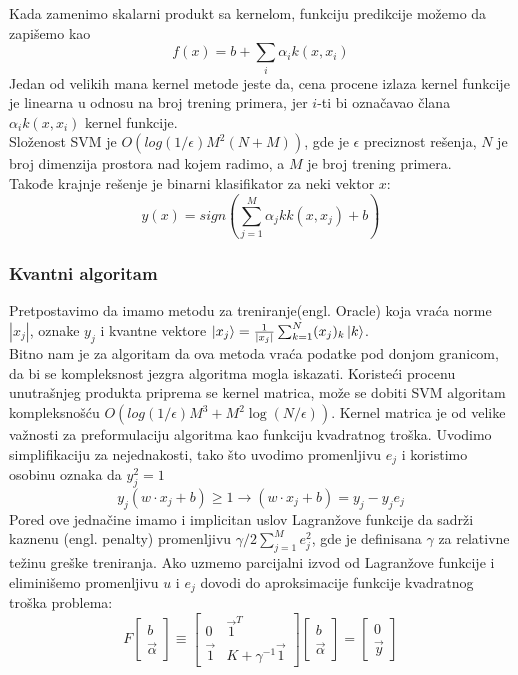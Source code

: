 \documentclass[12pt, letterpaper, oneside]{article}
\begin{document}
Kada zamenimo skalarni produkt sa kernelom, funkciju predikcije možemo da zapišemo kao
\[
    f(x) = b + \sum_i \alpha_{i}k(x,x_i)
\]
Jedan od velikih mana kernel metode jeste da, cena procene izlaza kernel funkcije je linearna u odnosu na broj trening primera, jer $i$-ti bi označavao člana $\alpha_ik(x,x_i)$ kernel funkcije. \cite{goodfellow2016deep} \\
Složenost SVM je $O(log(1/\epsilon)M^2(N+M))$, gde je $\epsilon$ preciznost rešenja, $N$ je broj dimenzija prostora nad kojem radimo, a $M$ je broj trening primera. \\
Takođe krajnje rešenje je binarni klasifikator za neki vektor $x$:
\[
    y(x) = sign(\sum_{j=1}^{M}\alpha_jkk(x,x_j) + b)
\]

\subsubsection{Kvantni algoritam}
Pretpostavimo da imamo metodu za treniranje(engl. Oracle) koja vraća norme $|x_j|$, oznake $y_j$ i kvantne vektore $\Ket{x_j} = \frac{1}{|x_j|}\sum_{k=1}^{N}(x_j)_k\Ket{k}$. \\
Bitno nam je za algoritam da ova metoda vraća podatke pod donjom granicom, da bi se kompleksnost jezgra algoritma mogla iskazati.
Koristeći procenu unutrašnjeg produkta priprema se kernel matrica, može se dobiti SVM algoritam kompleksnošću $O(log(1/\epsilon)M^3 + M^{2}\log(N/\epsilon))$.
Kernel matrica je od velike važnosti za preformulaciju algoritma kao funkciju kvadratnog troška. 
Uvodimo simplifikaciju za nejednakosti, tako što uvodimo promenljivu $e_j$ i koristimo osobinu oznaka da $y_j^2=1$
\[
    y_{j}(w \cdot x_j + b) \geq 1 \to (w \cdot x_j + b) = y_{j} - y_{j}e_{j}
\]
Pored ove jednačine imamo i implicitan uslov Lagranžove funkcije da sadrži kaznenu (engl. penalty) promenljivu
$\gamma/2\sum_{j=1}^{M}e_j^2$, gde je definisana $\gamma$ za relativne težinu greške treniranja.
Ako uzmemo parcijalni izvod od Lagranžove funkcije i eliminišemo promenljivu $u$ i $e_j$ dovodi do aproksimacije funkcije kvadratnog troška problema:
\[
    F\begin{bmatrix}
        b \\
        \overrightarrow{\alpha}
    \end{bmatrix}
    \equiv \begin{bmatrix}
        0 & \overrightarrow{1}^T \\
        \overrightarrow{1} & K+\gamma^{-1} \overrightarrow{1}
    \end{bmatrix}
    \begin{bmatrix}
        b \\
        \overrightarrow{\alpha}
    \end{bmatrix} =
    \begin{bmatrix}
        0 \\
        \overrightarrow{y}
    \end{bmatrix}
\]
\end{document}
